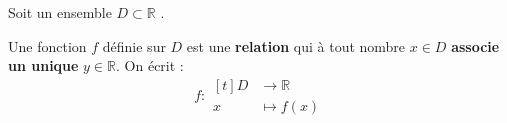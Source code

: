 \documentclass[main.tex]{subfiles}
\begin{document}
\newpage
\begin{definition}[vieillotte]
	Soit un ensemble $D\subset \mathbb{R}$ .
	
	Une fonction $f$ définie sur $D$ est une \textbf{relation} qui à tout nombre $x\in D$ \textbf{associe un unique} $y\in \mathbb{R}$. On écrit : 
\setlength{\abovedisplayskip}{3pt} 
\setlength{\belowdisplayskip}{3pt} 
$$
	f :   \begin{aligned}[t]  D &\to \mathbb{R}\\
		x&\mapsto f(x)
	\end{aligned} 
$$ 
\end{definition}
\end{document}
